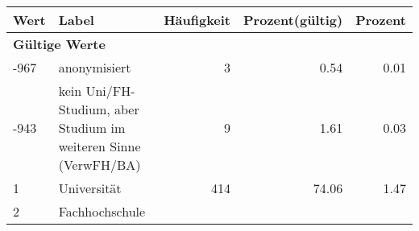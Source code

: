      \begin{longtable}{lXrrr}
     \toprule
     \textbf{Wert} & \textbf{Label} & \textbf{Häufigkeit} & \textbf{Prozent(gültig)} & \textbf{Prozent} \\
     \endhead
     \midrule
     \multicolumn{5}{l}{\textbf{Gültige Werte}}\\

     -967 &
     \multicolumn{1}{X}{ anonymisiert   } &


       \num{3} &
       \num[round-mode=places,round-precision=2]{0,54} &
         \num[round-mode=places,round-precision=2]{0,01} \\

     -943 &
     \multicolumn{1}{X}{ kein Uni/FH-Studium, aber Studium im weiteren Sinne (VerwFH/BA)   } &


       \num{9} &
       \num[round-mode=places,round-precision=2]{1,61} &
         \num[round-mode=places,round-precision=2]{0,03} \\

     1 &
     \multicolumn{1}{X}{ Universität   } &


       \num{414} &
       \num[round-mode=places,round-precision=2]{74,06} &
         \num[round-mode=places,round-precision=2]{1,47} \\

     2 &
     \multicolumn{1}{X}{ Fachhochschule   } &



\end{longtable}
